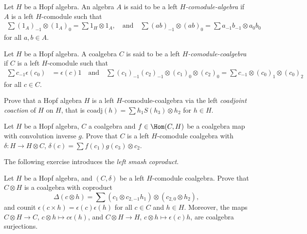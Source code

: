 \documentclass[12pt]{amsproc}
\begin{document}
\begin{definition}
Let $H$ be a Hopf algebra. An algebra $A$ is said to be a left
\emph{$H$-comodule-algebra} if $A$ is a left $H$-comodule such that 
\begin{align*}
\sum (1_A)_{-1}\otimes (1_A)_0 =\sum 1_{H}\otimes1_{A},
\quad\text{and}\quad 
\sum (ab)_{-1}\otimes (ab)_0 =\sum a_{-1}b_{-1}\otimes a_{0}b_{0}
\end{align*}
for all $a,b\in A$. 
\end{definition}


\begin{definition}
Let $H$ be a Hopf algebra. A coalgebra $C$ is said to be a left
\emph{$H$-comodule-coalgebra} if $C$ 
is a left $H$-comodule such that 
\begin{align*}
\sum c_{-1}\epsilon(c_{0}) & =\epsilon(c)1
\quad\text{and}\quad 
\sum (c_{1})_{-1}(c_{2})_{-1}\otimes(c_{1})_{0}\otimes(c_{2})_{0}  =\sum c_{-1}\otimes(c_{0})_{1}\otimes(c_{0})_{2}
\end{align*}
for all $c\in C$.
\end{definition}

\begin{exercise}
Prove that a Hopf algebra 
$H$ is a left $H$-comodule-coalgebra via the left \emph{coadjoint coaction}
of $H$ on $H$, that is $\mathrm{coadj}(h)=\sum h_{1}S(h_{3})\otimes h_{2}$ for $h\in H$. 
\end{exercise}

\begin{exercise}
Let $H$ be a Hopf algebra, $C$ a coalgebra and $f\in\Hom(C,H)$
be a coalgebra map with convolution inverse $g$. Prove that $C$ 
is a left $H$-comodule coalgebra with
$\delta\colon H\to H\otimes C$, 
$\delta(c)=\sum f(c_{1})g(c_{3})\otimes c_{2}$. 
\end{exercise}

The following exercise introduces the 
\emph{left smash coproduct}.

\begin{exercise}
\label{xca:smash_coleft}
Let $H$ be a Hopf algebra, and $(C,\delta)$ be a left $H$-comodule
coalgebra. Prove that $C\otimes H$ is a coalgebra with coproduct
\[
\Delta(c\otimes h)=\sum \left(c_{1}\otimes c_{2,-1}h_{1}\right)\otimes\left(c_{2,0}\otimes h_{2}\right),
\]
and counit $\epsilon(c\times h)=\epsilon(c)\epsilon(h)$ for
all $c\in C$ and $h\in H$.  Moreover, the maps $C\otimes H\to C$,
$c\otimes h\mapsto c\epsilon(h)$, and $C\otimes H\to H$, $c\otimes h\mapsto
\epsilon(c)h$, are coalgebra surjections.
\end{exercise}
\end{document}
